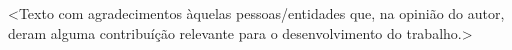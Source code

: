 \begin{agradecimentos}
\textless Texto com agradecimentos àquelas pessoas/entidades que, na opinião do autor, deram alguma contribuíção relevante para o desenvolvimento do trabalho.\textgreater
\end{agradecimentos}

